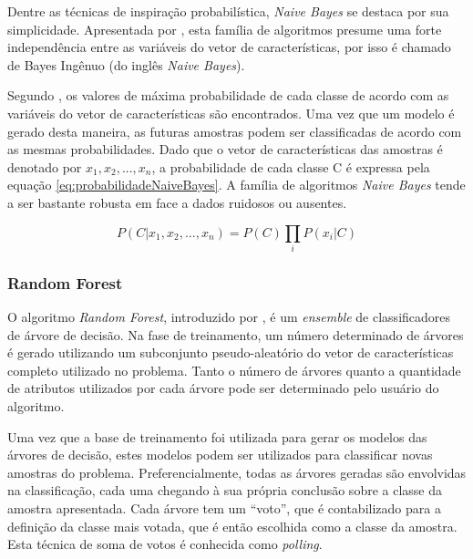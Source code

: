 Dentre as técnicas de inspiração probabilística, \textit{Naive Bayes} se destaca por sua simplicidade. Apresentada por , esta família de algoritmos presume uma forte independência entre as variáveis do vetor de características, por isso é chamado de Bayes Ingênuo (do inglês \textit{Naive Bayes}).

Segundo , os valores de máxima probabilidade de cada classe de acordo com as variáveis do vetor de características são encontrados. Uma vez que um modelo é gerado desta maneira, as futuras amostras podem ser classificadas de acordo com as mesmas probabilidades. Dado que o vetor de características das amostras é denotado por $x_1, x_2,...,x_n$, a probabilidade de cada classe C é expressa pela equação \ref{eq:probabilidadeNaiveBayes}. A família de algoritmos \textit{Naive Bayes} tende a ser bastante robusta em face a dados ruidosos ou ausentes.

\begin{equation}
	\displaystyle P(C|x_1,x_2,...,x_n) = P(C) \prod_{i}{P(x_i|C)}
\label{eq:probabilidadeNaiveBayes}
\end{equation}

\subsubsection*{Random Forest}

O algoritmo \textit{Random Forest}, introduzido por  , é um \textit{ensemble} de classificadores de árvore de decisão. Na fase de treinamento, um número determinado de árvores é gerado utilizando um subconjunto pseudo-aleatório do vetor de características completo utilizado no problema. Tanto o número de árvores quanto a quantidade de atributos utilizados por cada árvore pode ser determinado pelo usuário do algoritmo.

Uma vez que a base de treinamento foi utilizada para gerar os modelos das árvores de decisão, estes modelos podem ser utilizados para classificar novas amostras do problema. Preferencialmente, todas as árvores geradas são envolvidas na classificação, cada uma chegando à sua própria conclusão sobre a classe da amostra apresentada. Cada árvore tem um ``voto'', que é contabilizado para a definição da classe mais votada, que é então escolhida como a classe da amostra. Esta técnica de soma de votos é conhecida como \textit{polling}.

